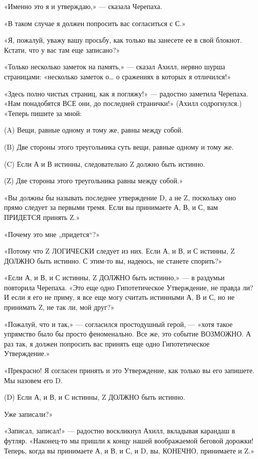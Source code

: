 «Именно это я и утверждаю,» --- сказала Черепаха.

«В таком случае я должен попросить вас согласиться с С.»

«Я, пожалуй, уважу вашу просьбу, как только вы занесете ее в свой блокнот. Кстати, что у вас там еще записано?»

«Только несколько заметок на память,» --- сказал Ахилл, нервно шурша страницами: «несколько заметок о\ldots{} о сражениях в которых я отличился!»

«Здесь полно чистых страниц, как я погляжу!» --- радостно заметила Черепаха. «Нам понадобятся ВСЕ они, до последней странички!» (Ахилл содрогнулся.) «Теперь пишите за мной:

(A) Вещи, равные одному и тому же, равны между собой.

(B) Две стороны этого треугольника суть вещи, равные одному и тому же.

(C) Если А и В истинны, следовательно Z должно быть истинно.

(Z) Две стороны этого треугольника равны между собой.»

«Вы должны бы называть последнее утверждение D, а не Z, поскольку оно прямо следует за первыми тремя. Если вы принимаете А, В, и С, вам ПРИДЕТСЯ принять Z.»

«Почему это мне „придется``?»

«Потому что Z ЛОГИЧЕСКИ следует из них. Если А, и В, и С истинны, Z ДОЛЖНО быть истинно. С этим-то вы, надеюсь, не станете спорить?»

«Если А, и В, и С истинны, Z ДОЛЖНО быть истинно,» --- в раздумьи повторила Черепаха. «Это еще одно Гипотетическое Утверждение, не правда ли? И если я его не приму, я все еще могу считать истинными А, В и С, но не принимать Z, не так ли, мой друг?»

«Пожалуй, что и так,» --- согласился простодушный герой, --- «хотя такое упрямство было бы просто феноменально. Все же, это событие ВОЗМОЖНО. А раз так, я должен попросить вас принять еще одно Гипотетическое Утверждение.»

«Прекрасно! Я согласен принять и это Утверждение, как только вы его запишете. Мы назовем его D.

(D) Если А, и В, и С истинны, Z ДОЛЖНО быть истинно.

Уже записали?»

«Записал, записал!» --- радостно воскликнул Ахилл, вкладывая карандаш в футляр. «Наконец-то мы пришли к концу нашей воображаемой беговой дорожки! Теперь, когда вы принимаете А, и В, и С, и D, вы, КОНЕЧНО, принимаете и Z.»

